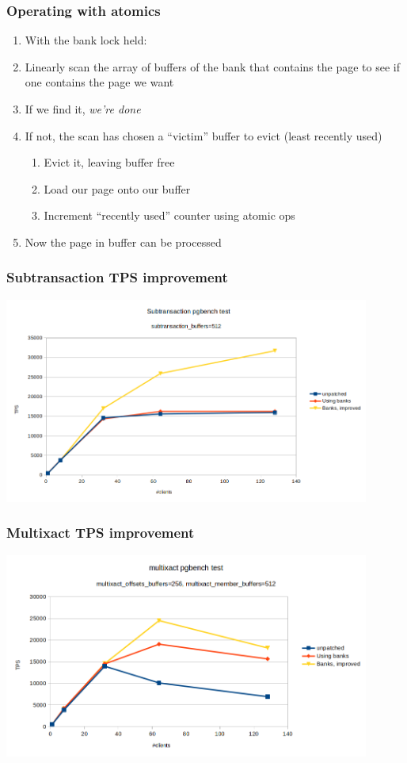 \begin{frame}
  \frametitle{Operating with atomics}
  \begin{enumerate}
    \item With the bank lock held:
    \item Linearly scan the array of buffers of the bank that contains the page to see if one contains the page we want
    \item If we find it, \emph{we're done}
    \item If not, the scan has chosen a ``victim'' buffer to evict (least recently used)
      \begin{enumerate}
	\item Evict it, leaving buffer free
	\item Load our page onto our buffer
	\item \alert{Increment ``recently used'' counter using atomic ops}
      \end{enumerate}
    \item Now the page in buffer can be processed 
  \end{enumerate}
\end{frame}

\begin{frame}
  \frametitle{Subtransaction TPS improvement}
  \includegraphics[width=0.9\textwidth]{subtrans-tps.png}
\end{frame}

\begin{frame}
  \frametitle{Multixact TPS improvement}
  \includegraphics[width=0.9\textwidth]{multixact-tps.png}
\end{frame}


